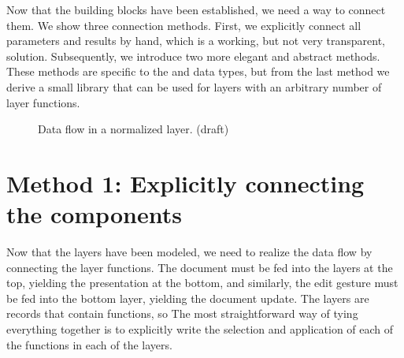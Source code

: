 \documentclass[preprint,natbib]{sigplanconf}
\begin{document}
\bc
Now that the building blocks have been established, we need a way to connect them. We show three connection methods. First, we explicitly connect all parameters and results by hand, which is a working, but not very transparent, solution. Subsequently, we introduce two more elegant and abstract methods. These methods are specific to the  and  data types, but from the last method we derive a small library that can be used for layers with an arbitrary number of layer functions. 
\ec

\begin{figure}
\begin{small}
\begin{center}
\begin{center}
\begin{minipage}[b]{\textwidth}
\begin{scriptsize}
\end{scriptsize}
\end{minipage}
\end{center}\caption{Data flow in a normalized layer. (draft)}\label{wrapped} 
\end{center}
\end{small}
\end{figure}


%																
%																
%																
\section{Method 1: Explicitly connecting the components} \label{sect:simple}

Now that the layers have been modeled, we need to realize the data flow by connecting the layer functions. The document must be fed into the layers at the top, yielding the presentation at the bottom, and similarly, the edit gesture must be fed into the bottom layer, yielding the document update. \bc The layers are records that contain functions, so  \ec The most straightforward way of tying everything together is to explicitly write the selection and application of each of the functions in each of the layers. 
\end{document}
